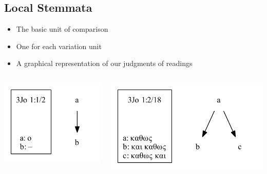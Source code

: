 \documentclass[10pt]{beamer}
\begin{document}
	\subsection{Local Stemmata}
	\begin{frame}
		\begin{itemize}
			\item The basic unit of comparison
			\item One for each variation unit
			\item A graphical representation of our judgments of readings
		\end{itemize}
		\begin{columns}
			\begin{column}{0.45\textwidth}
				\begin{center}
					\includegraphics[scale=0.5]{../img/B25K1V1U2-local-stemma.pdf}
				\end{center}
			\end{column}
			\begin{column}{0.45\textwidth}
				\begin{center}
					\includegraphics[scale=0.5]{../img/B25K1V2U18-local-stemma.pdf}
				\end{center}
			\end{column}
		\end{columns}
	\end{frame}
\end{document}
